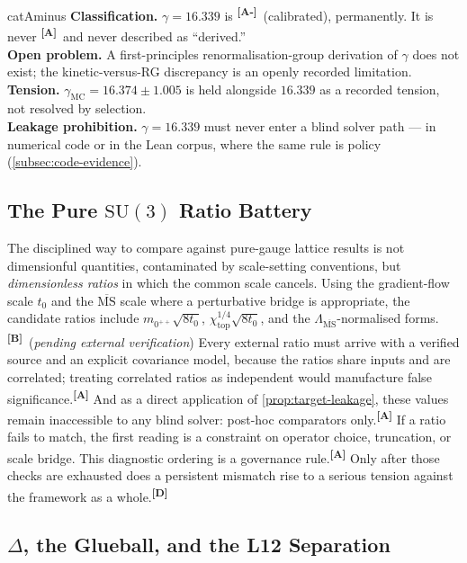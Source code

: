 \documentclass[12pt,a4paper,twoside]{article}
\theoremstyle{plain}
\theoremstyle{definition}
\theoremstyle{remark}
\newcommand{\catmark}[1]{\textsuperscript{\textsf{\textbf{[#1]}}}}
\newcommand{\GammaGeom}{16.339} %
\newcommand{\GammaMC}{16.374 \pm 1.005} %
\begin{document}
\begin{evidencebox}{catAminus}
\textbf{Classification.} $\gamma = \GammaGeom$ is \catmark{A-}\
(calibrated), permanently. It is never \catmark{A}\ and never described
as ``derived.''\\[0.3em]
\textbf{Open problem.} A first-principles renormalisation-group
derivation of $\gamma$ does not exist; the kinetic-versus-RG discrepancy
is an openly recorded limitation.\\[0.3em]
\textbf{Tension.} $\gamma_{\mathrm{MC}} = \GammaMC$ is held alongside
$16.339$ as a recorded tension, not resolved by selection.\\[0.3em]
\textbf{Leakage prohibition.} $\gamma = 16.339$ must never enter a blind
solver path --- in numerical code or in the Lean corpus, where the same
rule is policy (\cref{subsec:code-evidence}).
\end{evidencebox}

\subsection{The Pure \texorpdfstring{$\mathrm{SU}(3)$}{SU(3)} Ratio Battery}
\label{subsec:ratio-battery}

The disciplined way to compare against pure-gauge lattice results is not
dimensionful quantities, contaminated by scale-setting conventions, but
\emph{dimensionless ratios} in which the common scale cancels. Using the
gradient-flow scale $t_0$ and the $\overline{\mathrm{MS}}$ scale where a
perturbative bridge is appropriate, the candidate ratios include
$m_{0^{++}}\sqrt{8t_0}$, $\chi_{\mathrm{top}}^{1/4}\sqrt{8t_0}$, and the
$\Lambda_{\overline{\mathrm{MS}}}$-normalised forms.\catmark{B}\ (\emph{pending external verification})
Every external ratio must arrive with a verified source and an explicit
covariance model, because the ratios share inputs and are correlated;
treating correlated ratios as independent would manufacture false
significance.\catmark{A} And as a direct application of
\cref{prop:target-leakage}, these values remain inaccessible to any
blind solver: post-hoc comparators only.\catmark{A} If a ratio fails to
match, the first reading is a constraint on operator choice, truncation,
or scale bridge. This diagnostic ordering is a governance rule.\catmark{A}
Only after those checks are exhausted does a persistent mismatch rise to a
serious tension against the framework as a whole.\catmark{D}

\subsection{\texorpdfstring{$\Delta$}{Delta}, the Glueball, and the L12 Separation}
\label{subsec:delta-glueball-l12}
\end{document}
